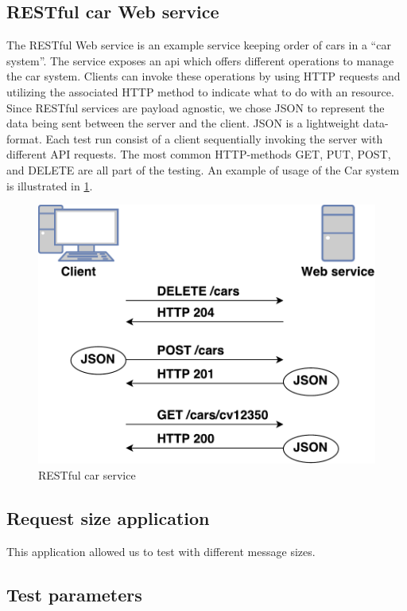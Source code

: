\subsection{RESTful car Web service}

The RESTful Web service is an example service keeping order of cars in a ``car
system''. The service exposes an \gls{api} which offers different operations to
manage the car system. Clients can invoke these operations by using HTTP
requests and utilizing the associated HTTP method to indicate what to do with an
resource. Since RESTful services are payload agnostic, we chose JSON to
represent the data being sent between the server and the client. JSON is a
lightweight data-format. Each test run consist of a client sequentially invoking
the server with different API requests. The most common HTTP-methods GET, PUT,
POST, and DELETE are all part of the testing. An example of usage of the Car
system is illustrated in \cref{figure-rest-flow}.

\begin{figure}[h]
\centering
\includegraphics[scale=0.6]{images/rest_flow.pdf}
\caption{RESTful car service}
\label{figure-rest-flow}
\end{figure}


\subsection{Request size application}

This application allowed us to test with different message sizes.

\subsection{Test parameters}

